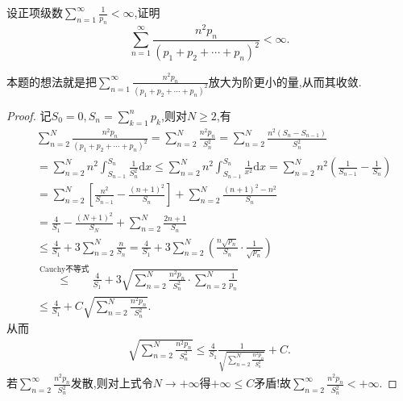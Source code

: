 \documentclass[../../main.tex]{subfiles}
\begin{document}
\begin{example}
设正项级数$\sum\limits_{n=1}^\infty \frac{1}{p_n}<\infty$,证明
$$\sum_{n=1}^\infty \frac{n^2 p_n}{(p_1+p_2+\cdots +p_n)^2}<\infty.$$
\end{example}
\begin{remark}
本题的想法就是把$\sum\limits_{n=1}^\infty \frac{n^2 p_n}{(p_1+p_2+\cdots +p_n)^2}$放大为阶更小的量,从而其收敛.
\end{remark}
\begin{proof}
记$S_0=0,S_n=\sum_{k=1}^n{p_k}$,则对$N\geqslant 2$,有
\begin{align*}
&\sum_{n=2}^N{\frac{n^2p_n}{(p_1+p_2+\cdots +p_n)^2}}=\sum_{n=2}^N{\frac{n^2p_n}{S_{n}^{2}}}=\sum_{n=2}^N{\frac{n^2\left( S_n-S_{n-1} \right)}{S_{n}^{2}}} \\
&=\sum_{n=2}^N{n^2\int_{S_{n-1}}^{S_n}{\frac{1}{S_{n}^{2}}\mathrm{d}x}}\leqslant \sum_{n=2}^N{n^2\int_{S_{n-1}}^{S_n}{\frac{1}{x^2}\mathrm{d}x}}=\sum_{n=2}^N{n^2\left( \frac{1}{S_{n-1}}-\frac{1}{S_n} \right)} \\
&=\sum_{n=2}^N{\left[ \frac{n^2}{S_{n-1}}-\frac{\left( n+1 \right) ^2}{S_n} \right]}+\sum_{n=2}^N{\frac{\left( n+1 \right) ^2-n^2}{S_n}} \\
&=\frac{4}{S_1}-\frac{\left( N+1 \right) ^2}{S_N}+\sum_{n=2}^N{\frac{2n+1}{S_n}} \\
&\leqslant \frac{4}{S_1}+3\sum_{n=2}^N{\frac{n}{S_n}}=\frac{4}{S_1}+3\sum_{n=2}^N{\left( \frac{n\sqrt{p_n}}{S_n}\cdot \frac{1}{\sqrt{p_n}} \right)} \\
&\overset{\text{Cauchy不等式}}{\leqslant}\frac{4}{S_1}+3\sqrt{\sum_{n=2}^N{\frac{n^2p_n}{S_{n}^{2}}}\cdot \sum_{n=2}^N{\frac{1}{p_n}}} \\
&\leqslant \frac{4}{S_1}+C\sqrt{\sum_{n=2}^N{\frac{n^2p_n}{S_{n}^{2}}}}.
\end{align*}
从而
\begin{align*}
\sqrt{\sum_{n=2}^N{\frac{n^2p_n}{S_{n}^{2}}}}\leqslant \frac{4}{S_1}\frac{1}{\sqrt{\sum\limits_{n=2}^N{\frac{n^2p_n}{S_{n}^{2}}}}}+C.
\end{align*}
若$\sum_{n=2}^{\infty}{\frac{n^2p_n}{S_{n}^{2}}}$发散,则对上式令$N\rightarrow +\infty$得$+\infty \leqslant C$矛盾!故$\sum_{n=2}^{\infty}{\frac{n^2p_n}{S_{n}^{2}}}<+\infty .$
\end{proof}
\end{document}
